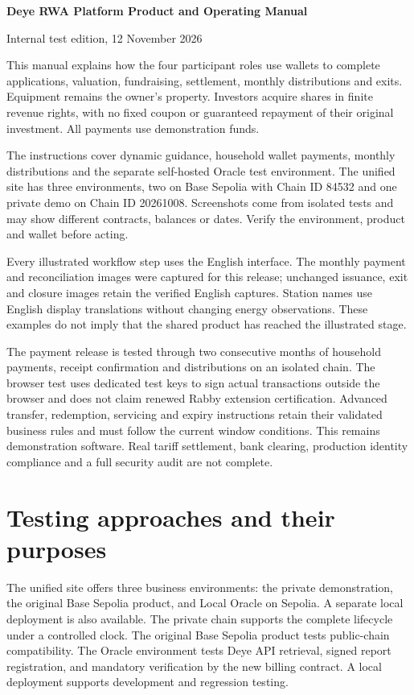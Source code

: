 \documentclass[12pt,a4paper]{article}
\begin{document}
\begin{center}\textbf{Deye RWA Platform Product and Operating Manual}\end{center}
Internal test edition, 12 November 2026

This manual explains how the four participant roles use wallets to complete applications, valuation, fundraising, settlement, monthly distributions and exits. Equipment remains the owner’s property. Investors acquire shares in finite revenue rights, with no fixed coupon or guaranteed repayment of their original investment. All payments use demonstration funds.

The instructions cover dynamic guidance, household wallet payments, monthly distributions and the separate self-hosted Oracle test environment. The unified site has three environments, two on Base Sepolia with Chain ID 84532 and one private demo on Chain ID 20261008. Screenshots come from isolated tests and may show different contracts, balances or dates. Verify the environment, product and wallet before acting.

Every illustrated workflow step uses the English interface. The monthly payment and reconciliation images were captured for this release; unchanged issuance, exit and closure images retain the verified English captures. Station names use English display translations without changing energy observations. These examples do not imply that the shared product has reached the illustrated stage.

The payment release is tested through two consecutive months of household payments, receipt confirmation and distributions on an isolated chain. The browser test uses dedicated test keys to sign actual transactions outside the browser and does not claim renewed Rabby extension certification. Advanced transfer, redemption, servicing and expiry instructions retain their validated business rules and must follow the current window conditions. This remains demonstration software. Real tariff settlement, bank clearing, production identity compliance and a full security audit are not complete.

\renewcommand{\contentsname}{Contents}\clearpage\tableofcontents
\clearpage\section{Testing approaches and their purposes}
The unified site offers three business environments: the private demonstration, the original Base Sepolia product, and Local Oracle on Sepolia. A separate local deployment is also available. The private chain supports the complete lifecycle under a controlled clock. The original Base Sepolia product tests public-chain compatibility. The Oracle environment tests Deye API retrieval, signed report registration, and mandatory verification by the new billing contract. A local deployment supports development and regression testing.
\end{document}

